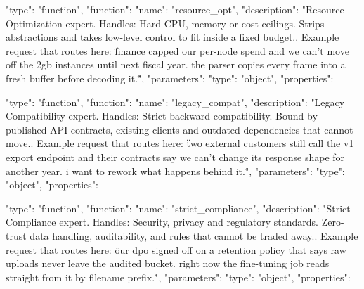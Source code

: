\begin{promptverbatim}
{
  "type": "function",
  "function": {
    "name": "resource_opt",
    "description": "Resource Optimization expert. Handles: Hard CPU, memory or cost ceilings. Strips abstractions and takes low-level control to fit inside a fixed budget.. Example request that routes here: \"finance capped our per-node spend and we can't move off the 2gb instances until next fiscal year. the parser copies every frame into a fresh buffer before decoding it.\"",
    "parameters": {
      "type": "object",
      "properties": {}
    }
  }
}
\end{promptverbatim}

\begin{promptverbatim}
{
  "type": "function",
  "function": {
    "name": "legacy_compat",
    "description": "Legacy Compatibility expert. Handles: Strict backward compatibility. Bound by published API contracts, existing clients and outdated dependencies that cannot move.. Example request that routes here: \"two external customers still call the v1 export endpoint and their contracts say we can't change its response shape for another year. i want to rework what happens behind it.\"",
    "parameters": {
      "type": "object",
      "properties": {}
    }
  }
}
\end{promptverbatim}

\begin{promptverbatim}
{
  "type": "function",
  "function": {
    "name": "strict_compliance",
    "description": "Strict Compliance expert. Handles: Security, privacy and regulatory standards. Zero-trust data handling, auditability, and rules that cannot be traded away.. Example request that routes here: \"our dpo signed off on a retention policy that says raw uploads never leave the audited bucket. right now the fine-tuning job reads straight from it by filename prefix.\"",
    "parameters": {
      "type": "object",
      "properties": {}
    }
  }
}
\end{promptverbatim}
